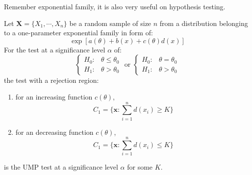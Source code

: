 \documentclass{huhtakm-template-book-v2}
\begin{document}
Remember exponential family, it is also very useful on hypothesis testing.
\begin{cor}
	Let $\mathbf{X}=\{X_{1},\cdots,X_{n}\}$ be a random sample of size $n$ from a distribution belonging to a one-parameter exponential family in form of:
	\begin{equation*}
		\exp[a(\theta)+b(x)+c(\theta)d(x)]
	\end{equation*}
	For the test at a significance level $\alpha$ of:
	\begin{equation*}
		\begin{cases}
			H_{0}: &\theta\leq\theta_{0}\\
			H_{1}: &\theta>\theta_{0}
		\end{cases}\text{ or }\begin{cases}
			H_{0}: &\theta=\theta_{0}\\
			H_{1}: &\theta>\theta_{0}
		\end{cases}
	\end{equation*}
	the test with a rejection region:
	\begin{enumerate}
		\item for an increasing function $c(\theta)$,
		\begin{equation*}
			C_{1}=\biggl\{\mathbf{x}:\sum_{i=1}^{n}d(x_{i})\geq K\biggr\}
		\end{equation*}
		\item for an decreasing function $c(\theta)$,
		\begin{equation*}
			C_{1}=\biggl\{\mathbf{x}:\sum_{i=1}^{n}d(x_{i})\leq K\biggr\}
		\end{equation*}
	\end{enumerate}
	is the UMP test at a significance level $\alpha$ for some $K$.
\end{cor}
\end{document}
